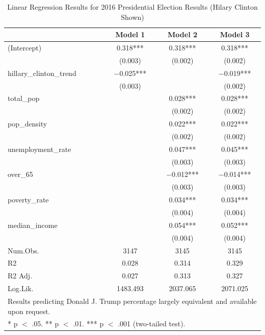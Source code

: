 \documentclass[
]{article}
\begin{document}
\begin{table}

\caption{\label{tab:pres_2016_analysis}Linear Regression Results for 2016 Presidential Election Results (Hilary Clinton Shown)}
\centering
\begin{tabular}[t]{lccc}
\toprule
  & Model 1 & Model 2 & Model 3\\
\midrule
(Intercept) & \num{0.318}*** & \num{0.318}*** & \num{0.318}***\\
 & (\num{0.003}) & (\num{0.002}) & (\num{0.002})\\
hillary\_clinton\_trend & \num{-0.025}*** &  & \num{-0.019}***\\
 & (\num{0.003}) &  & (\num{0.002})\\
total\_pop &  & \num{0.028}*** & \num{0.028}***\\
 &  & (\num{0.002}) & \vphantom{1} (\num{0.002})\\
pop\_density &  & \num{0.022}*** & \num{0.022}***\\
 &  & (\num{0.002}) & (\num{0.002})\\
unemployment\_rate &  & \num{0.047}*** & \num{0.045}***\\
 &  & (\num{0.003}) & \vphantom{1} (\num{0.003})\\
over\_65 &  & \num{-0.012}*** & \num{-0.014}***\\
 &  & (\num{0.003}) & (\num{0.003})\\
poverty\_rate &  & \num{0.034}*** & \num{0.034}***\\
 &  & (\num{0.004}) & \vphantom{1} (\num{0.004})\\
median\_income &  & \num{0.054}*** & \num{0.052}***\\
 &  & (\num{0.004}) & (\num{0.004})\\
\midrule
Num.Obs. & \num{3147} & \num{3145} & \num{3145}\\
R2 & \num{0.028} & \num{0.314} & \num{0.329}\\
R2 Adj. & \num{0.027} & \num{0.313} & \num{0.327}\\
Log.Lik. & \num{1483.493} & \num{2037.065} & \num{2071.025}\\
\bottomrule
\multicolumn{4}{l}{\rule{0pt}{1em}Results predicting Donald J. Trump percentage largely equivalent and available upon request.}\\
\multicolumn{4}{l}{\rule{0pt}{1em}* p $<$ .05. ** p $<$ .01. *** p $<$ .001 (two-tailed test).}\\
\end{tabular}
\end{table}
\end{document}
